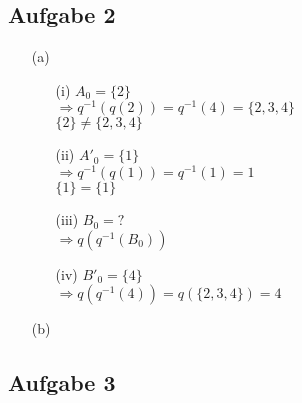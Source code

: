 \documentclass{article}
\begin{document}
\subsection*{Aufgabe 2}
    \begin{itemize}
        \item [(a)] \begin{itemize}
            \item [(i)] \(A_0 = \{2\}\) \\ \(\Rightarrow q^{-1}(q(2)) = q^{-1}(4) = \{2, 3, 4\}\) \\ \(\{2\} \not = \{2, 3, 4\}\) \\
            \item [(ii)] \(A'_0 = \{1\}\) \\ \(\Rightarrow q^{-1}(q(1)) = q^{-1}(1) = 1\) \\ \(\{1\} = \{1\}\) \\
            \item [(iii)] \(B_0 = ?\) \\ \( \Rightarrow q(q^{-1}(B_0))\) \\
            \item [(iv)] \(B'_0 = \{4\}\) \\ \(\Rightarrow q(q^{-1}(4)) = q(\{2, 3, 4\}) = 4\) \\

        \end{itemize}
        \item [(b)]
    \end{itemize}
    
\subsection*{Aufgabe 3}
\end{document}
